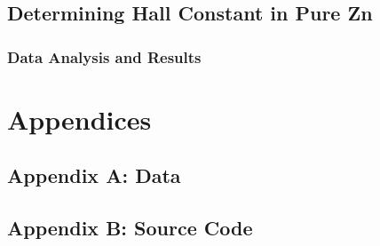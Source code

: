 \documentclass[a4paper]{article}
\begin{document}
\subsection{Determining Hall Constant in Pure Zn}

\subsubsection{Data Analysis and Results}

\section{Appendices}

\subsection{Appendix A: Data}

\subsection{Appendix B: Source Code}
\end{document}
